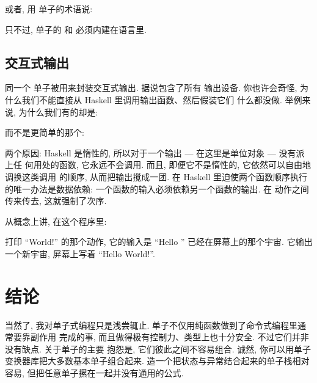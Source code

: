 或者, 用  单子的术语说:

只不过,  单子的 \code{>=>} 和  必须内建在语言里.

\subsection{交互式输出}

同一个  单子被用来封装交互式输出.  据说包含了所有
输出设备. 你也许会奇怪, 为什么我们不能直接从 Haskell 里调用输出函数、然后假装它们
什么都没做. 举例来说, 为什么我们有的却是:

而不是更简单的那个:

两个原因: Haskell 是惰性的, 所以对于一个输出 --- 在这里是单位对象 --- 没有派上任
何用处的函数, 它永远不会调用. 而且, 即便它不是惰性的, 它依然可以自由地调换这类调用
的顺序, 从而把输出搅成一团. 在 Haskell 里迫使两个函数顺序执行的唯一办法是数据依赖:
一个函数的输入必须依赖另一个函数的输出.  在  动作之间
传来传去, 这就强制了次序.

从概念上讲, 在这个程序里:

打印 ``World!'' 的那个动作, 它的输入是 ``Hello '' 已经在屏幕上的那个宇宙. 它输出
一个新宇宙, 屏幕上写着 ``Hello World!''.

\section{结论}

当然了, 我对单子式编程只是浅尝辄止. 单子不仅用纯函数做到了命令式编程里通常要靠副作用
完成的事, 而且做得极有控制力、类型上也十分安全. 不过它们并非没有缺点. 关于单子的主要
抱怨是, 它们彼此之间不容易组合. 诚然, 你可以用单子变换器库把大多数基本单子组合起来.
造一个把状态与异常结合起来的单子栈相对容易, 但把任意单子摞在一起并没有通用的公式.
